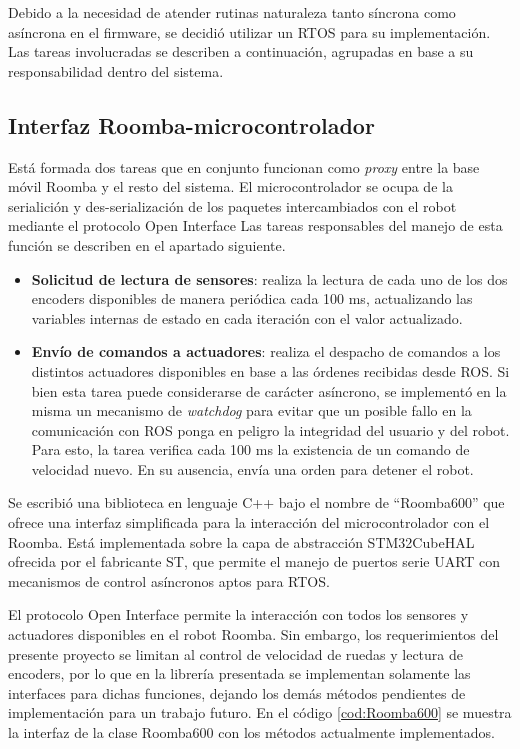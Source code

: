 Debido a la necesidad de atender rutinas naturaleza tanto síncrona como asíncrona en el firmware, se decidió utilizar un RTOS para su implementación. Las tareas involucradas se describen a continuación, agrupadas en base a su responsabilidad dentro del sistema.

\subsection{Interfaz Roomba-microcontrolador}

Está formada dos tareas que en conjunto funcionan como \textit{proxy} entre la base móvil Roomba y el resto del sistema. El microcontrolador se ocupa de la serialición y des-serialización de los paquetes intercambiados con el robot mediante el protocolo Open Interface Las tareas responsables del manejo de esta función se describen en el apartado siguiente.

\begin{itemize}
  \item \textbf{Solicitud de lectura de sensores}: realiza la lectura de cada uno de los dos encoders disponibles de manera periódica cada 100 ms, actualizando las variables internas de estado en cada iteración con el valor actualizado.
  \item \textbf{Envío de comandos a actuadores}: realiza el despacho de comandos a los distintos actuadores disponibles en base a las órdenes recibidas desde ROS. Si bien esta tarea puede considerarse de carácter asíncrono, se implementó en la misma un mecanismo de \textit{watchdog} para evitar que un posible fallo en la comunicación con ROS ponga en peligro la integridad del usuario y del robot. Para esto, la tarea verifica cada 100 ms la existencia de un comando de velocidad nuevo. En su ausencia, envía una orden para detener el robot.
\end{itemize}

Se escribió una biblioteca en lenguaje C++ bajo el nombre de ``Roomba600'' que ofrece una interfaz simplificada para la interacción del microcontrolador con el Roomba. Está implementada sobre la capa de abstracción STM32CubeHAL ofrecida por el fabricante ST, que permite el manejo de puertos serie UART con mecanismos de control asíncronos aptos para RTOS.

El protocolo Open Interface permite la interacción con todos los sensores y actuadores disponibles en el robot Roomba. Sin embargo, los requerimientos del presente proyecto se limitan al control de velocidad de ruedas y lectura de encoders, por lo que en la librería presentada se implementan solamente las interfaces para dichas funciones, dejando los demás métodos pendientes de implementación para un trabajo futuro. En el código \ref{cod:Roomba600} se muestra la interfaz de la clase Roomba600 con los métodos actualmente implementados.



